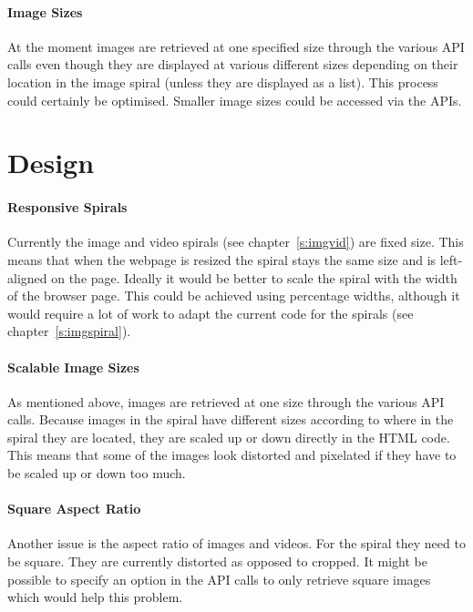 \paragraph{Image Sizes} 
At the moment images are retrieved at one specified size through the various \ac{API} calls even though they are displayed at various different sizes depending on their location in the image spiral (unless they are displayed as a list). This process could certainly be optimised. Smaller image sizes could be accessed via the \ac{API}s.


\section{Design}
\label{s:designaspi}

\paragraph{Responsive Spirals} 
Currently the image and video spirals (see chapter~\ref{s:imgvid}) are fixed size. This means that when the webpage is resized the spiral stays the same size and is left-aligned on the page. Ideally it would be better to scale the spiral with the width of the browser page. This could be achieved using percentage widths, although it would require a lot of work to adapt the current code for the spirals (see chapter~\ref{s:imgspiral}).

\paragraph{Scalable Image Sizes} 
As mentioned above, images are retrieved at one size through the various \ac{API} calls. Because images in the spiral have different sizes according to where in the spiral they are located, they are scaled up or down directly in the \ac{HTML} code. This means that some of the images look distorted and pixelated if they have to be scaled up or down too much.

\paragraph{Square Aspect Ratio} 
Another issue is the aspect ratio of images and videos. For the spiral they need to be square. They are currently distorted as opposed to cropped. It might be possible to specify an option in the \ac{API} calls to only retrieve square images which would help this problem.

